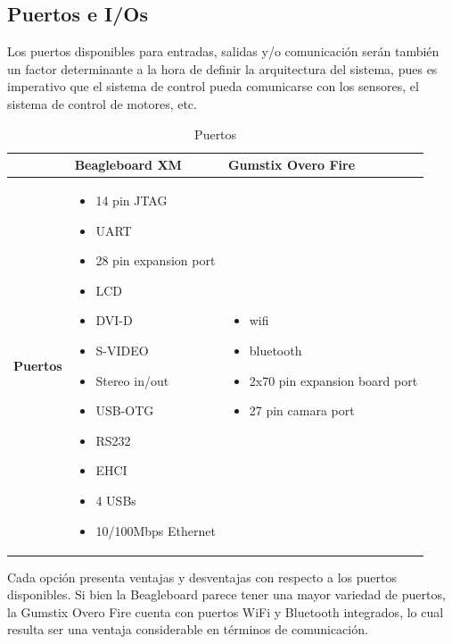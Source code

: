 \documentclass[main]{subfiles}
\begin{document}
\subsection*{Puertos e I/Os}

Los puertos disponibles para entradas, salidas y/o comunicaci\'on ser\'an tambi\'en un factor determinante a la hora de definir la arquitectura del sistema, pues es imperativo que el sistema de control pueda comunicarse con los sensores, el sistema de control de motores, etc.

\begin{table}[H]
\begin{tabular}{p{130pt}|p{130pt}|p{130pt}|} 
\cline{2-3}
& \cellcolor[gray]{0.8} \textbf{Beagleboard XM} 
& \cellcolor[gray]{0.8} \textbf{Gumstix Overo Fire} \\ \cline{1-3} \hline
\multicolumn{1}{|p{130pt}|}{\cellcolor[gray]{0.8}\textbf{Puertos}} 
&\begin{itemize}
\item 14 pin JTAG
\item UART
\item 28 pin expansion port
\item LCD
\item DVI-D
\item S-VIDEO
\item Stereo in/out
\item USB-OTG
\item RS232
\item EHCI
\item 4 USBs
\item 10/100Mbps Ethernet
\end{itemize}
&\begin{itemize}
\item wifi
\item bluetooth
\item 2x70 pin expansion board port
\item 27 pin camara port
\end{itemize}\\
\hline
\end{tabular}
\caption{Puertos}
\label{tab:puertos}
\end{table}

Cada opci\'on presenta ventajas y desventajas con respecto a los puertos disponibles. Si bien la Beagleboard parece tener una mayor variedad de puertos, la Gumstix Overo Fire cuenta con puertos WiFi y Bluetooth integrados, lo cual resulta ser una ventaja considerable en t\'erminos de comunicaci\'on.
\end{document}
